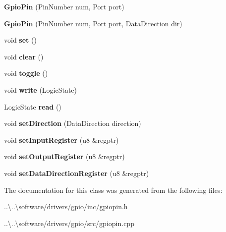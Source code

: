\begin{DoxyCompactItemize}
\item 
\mbox{\label{class_gpio_pin_a823123512552fe7226d12aeccccbdf6b}} 
{\bfseries Gpio\+Pin} (Pin\+Number num, Port port)
\item 
\mbox{\label{class_gpio_pin_a1da774161af27f3b9a0df07c5fa55fcd}} 
{\bfseries Gpio\+Pin} (Pin\+Number num, Port port, Data\+Direction dir)
\item 
\mbox{\label{class_gpio_pin_ae09d7d1ef774b3dfee5cdaee5bf9a812}} 
void {\bfseries set} ()
\item 
\mbox{\label{class_gpio_pin_ad45c67b3ac159ad8d133317062e351e9}} 
void {\bfseries clear} ()
\item 
\mbox{\label{class_gpio_pin_a43e55b13c02d838f5e2aa6ead319b7f6}} 
void {\bfseries toggle} ()
\item 
\mbox{\label{class_gpio_pin_a868ffd43b97af4082b43ab55794d8e9f}} 
void {\bfseries write} (Logic\+State)
\item 
\mbox{\label{class_gpio_pin_aae6ba33229b5237d943f1be6481164ef}} 
Logic\+State {\bfseries read} ()
\item 
\mbox{\label{class_gpio_pin_a0aef9e6efb8f955e07b6715a0801e51e}} 
void {\bfseries set\+Direction} (Data\+Direction direction)
\item 
\mbox{\label{class_gpio_pin_a721e97dfff89d09add23ae80ab869254}} 
void {\bfseries set\+Input\+Register} (u8 \&regptr)
\item 
\mbox{\label{class_gpio_pin_a0d12e95670d4426f50c419d9f6c2f954}} 
void {\bfseries set\+Output\+Register} (u8 \&regptr)
\item 
\mbox{\label{class_gpio_pin_a5389818286140e64e2383a4c2edacf63}} 
void {\bfseries set\+Data\+Direction\+Register} (u8 \&regptr)
\end{DoxyCompactItemize}


The documentation for this class was generated from the following files\+:\begin{DoxyCompactItemize}
\item 
..\textbackslash{}..\textbackslash{}software/drivers/gpio/inc/gpiopin.\+h\item 
..\textbackslash{}..\textbackslash{}software/drivers/gpio/src/gpiopin.\+cpp\end{DoxyCompactItemize}
